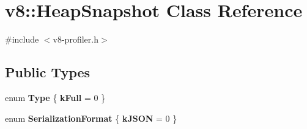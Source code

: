 \hypertarget{classv8_1_1_heap_snapshot}{}\section{v8\+:\+:Heap\+Snapshot Class Reference}
\label{classv8_1_1_heap_snapshot}


{\ttfamily \#include $<$v8-\/profiler.\+h$>$}

\subsection*{Public Types}
\begin{DoxyCompactItemize}
\item 
\hypertarget{classv8_1_1_heap_snapshot_ac199f9738b2143064af09e50a48b466d}{}enum {\bfseries Type} \{ {\bfseries k\+Full} = 0
 \}\label{classv8_1_1_heap_snapshot_ac199f9738b2143064af09e50a48b466d}

\item 
\hypertarget{classv8_1_1_heap_snapshot_a8ed7909568af85f7a36ef5f4da4dd495}{}enum {\bfseries Serialization\+Format} \{ {\bfseries k\+J\+S\+O\+N} = 0
 \}\label{classv8_1_1_heap_snapshot_a8ed7909568af85f7a36ef5f4da4dd495}

\end{DoxyCompactItemize}
